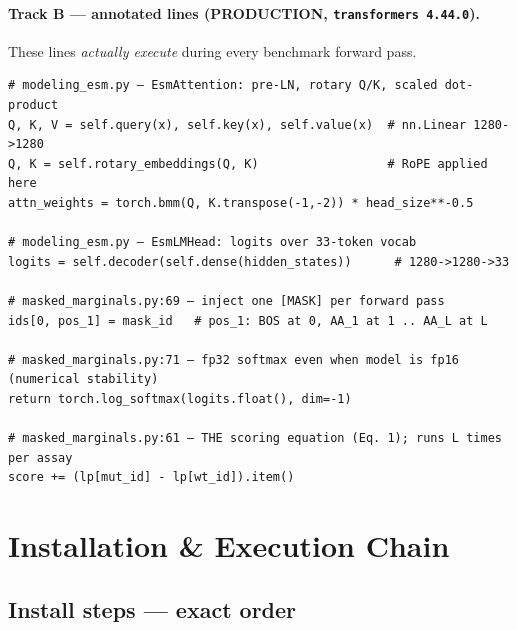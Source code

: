 \documentclass[11pt,a4paper]{article}
\begin{document}
\paragraph{Track B — annotated lines (PRODUCTION, \texttt{transformers 4.44.0}).}
These lines \emph{actually execute} during every benchmark forward pass.

\begin{lstlisting}[style=python,caption={%
  Track B: \texttt{transformers/models/esm/\{modeling,configuration,tokenization\}\_esm.py}
  (SHA256 pinned in \texttt{benchmark/verify\_integrity.py::TRANSFORMERS\_EXPECTED}).
  \texttt{scoring/masked\_marginals.py} is in-repo and tracked by git.
}]
# modeling_esm.py — EsmAttention: pre-LN, rotary Q/K, scaled dot-product
Q, K, V = self.query(x), self.key(x), self.value(x)  # nn.Linear 1280->1280
Q, K = self.rotary_embeddings(Q, K)                  # RoPE applied here
attn_weights = torch.bmm(Q, K.transpose(-1,-2)) * head_size**-0.5

# modeling_esm.py — EsmLMHead: logits over 33-token vocab
logits = self.decoder(self.dense(hidden_states))      # 1280->1280->33

# masked_marginals.py:69 — inject one [MASK] per forward pass
ids[0, pos_1] = mask_id   # pos_1: BOS at 0, AA_1 at 1 .. AA_L at L

# masked_marginals.py:71 — fp32 softmax even when model is fp16 (numerical stability)
return torch.log_softmax(logits.float(), dim=-1)

# masked_marginals.py:61 — THE scoring equation (Eq. 1); runs L times per assay
score += (lp[mut_id] - lp[wt_id]).item()
\end{lstlisting}

\section{Installation \& Execution Chain}

\subsection{Install steps — exact order}
\end{document}
